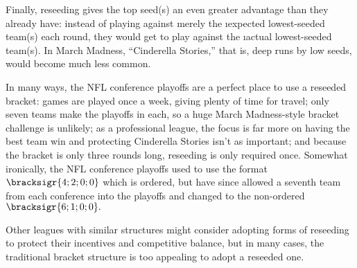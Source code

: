 {    Finally, reseeding gives the top seed(s) an even greater advantage than they already have: instead of playing against merely the \i{expected} lowest-seeded team(s) each round, they would get to play against the \i{actual} lowest-seeded team(s). In March Madness, ``Cinderella Stories,'' that is, deep runs by low seeds, would become much less common.

    In many ways, the NFL conference playoffs are a perfect place to use a reseeded bracket: games are played once a week, giving plenty of time for travel; only seven teams make the playoffs in each, so a huge March Madness-style bracket challenge is unlikely; as a professional league, the focus is far more on having the best team win and protecting Cinderella Stories isn't as important; and because the bracket is only three rounds long, reseeding is only required once. Somewhat ironically, the NFL conference playoffs used to use the format $\bracksigr{4;2;0;0}$ which is ordered, but have since allowed a seventh team from each conference into the playoffs and changed to the non-ordered $\bracksigr{6;1;0;0}.$

    Other leagues with similar structures might consider adopting forms of reseeding to protect their incentives and competitive balance, but in many cases, the traditional bracket structure is too appealing to adopt a reseeded one.

    }
